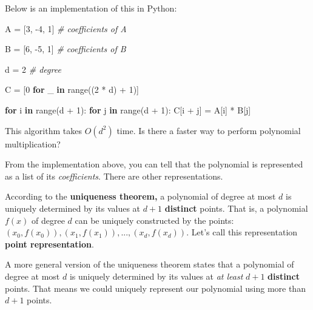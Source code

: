 \documentclass[11pt]{article}
\newenvironment{Shaded}{}{}
\newcommand{\KeywordTok}[1]{\textcolor[rgb]{0.00,0.44,0.13}{\textbf{{#1}}}}
\newcommand{\DecValTok}[1]{\textcolor[rgb]{0.25,0.63,0.44}{{#1}}}
\newcommand{\CommentTok}[1]{\textcolor[rgb]{0.38,0.63,0.69}{\textit{{#1}}}}
\newcommand{\NormalTok}[1]{{#1}}
\newcommand{\ControlFlowTok}[1]{\textcolor[rgb]{0.00,0.44,0.13}{\textbf{{#1}}}}
\newcommand{\OperatorTok}[1]{\textcolor[rgb]{0.40,0.40,0.40}{{#1}}}
\newcommand{\BuiltInTok}[1]{{#1}}
\begin{document}
    Below is an implementation of this in Python:

\begin{Shaded}
\begin{Highlighting}[]
\NormalTok{A }\OperatorTok{=}\NormalTok{ [}\DecValTok{3}\NormalTok{, }\OperatorTok{{-}}\DecValTok{4}\NormalTok{, }\DecValTok{1}\NormalTok{] }\CommentTok{\# coefficients of A}

\NormalTok{B }\OperatorTok{=}\NormalTok{ [}\DecValTok{6}\NormalTok{, }\OperatorTok{{-}}\DecValTok{5}\NormalTok{, }\DecValTok{1}\NormalTok{] }\CommentTok{\# coefficients of B}

\NormalTok{d }\OperatorTok{=} \DecValTok{2} \CommentTok{\# degree}

\NormalTok{C }\OperatorTok{=}\NormalTok{ [}\DecValTok{0} \ControlFlowTok{for}\NormalTok{ \_ }\KeywordTok{in} \BuiltInTok{range}\NormalTok{((}\DecValTok{2} \OperatorTok{*}\NormalTok{ d) }\OperatorTok{+} \DecValTok{1}\NormalTok{)]}

\ControlFlowTok{for}\NormalTok{ i }\KeywordTok{in} \BuiltInTok{range}\NormalTok{(d }\OperatorTok{+} \DecValTok{1}\NormalTok{):}
    \ControlFlowTok{for}\NormalTok{ j }\KeywordTok{in} \BuiltInTok{range}\NormalTok{(d }\OperatorTok{+} \DecValTok{1}\NormalTok{):}
\NormalTok{        C[i }\OperatorTok{+}\NormalTok{ j] }\OperatorTok{=}\NormalTok{ A[i] }\OperatorTok{*}\NormalTok{ B[j]}
\end{Highlighting}
\end{Shaded}

    This algorithm takes \(O(d^2)\) time. Is there a faster way to perform
polynomial multiplication?

From the implementation above, you can tell that the polynomial is
represented as a list of its \emph{coefficients}. There are other
representations.

According to the \textbf{uniqueness theorem,} a polynomial of degree at
most \(d\) is uniquely determined by its values at \(d + 1\)
\textbf{distinct} points. That is, a polynomial \(f(x)\) of degree \(d\)
can be uniquely constructed by the points:
\((x_0, f(x_0)), (x_1, f(x_1)),...,(x_d, f(x_d))\). Let's call this
representation \textbf{point representation}.

A more general version of the uniqueness theorem states that a
polynomial of degree at most \(d\) is uniquely determined by its values
at \emph{at least} \(d + 1\) \textbf{distinct} points. That means we
could uniquely represent our polynomial using more than \(d + 1\)
points.
\end{document}

